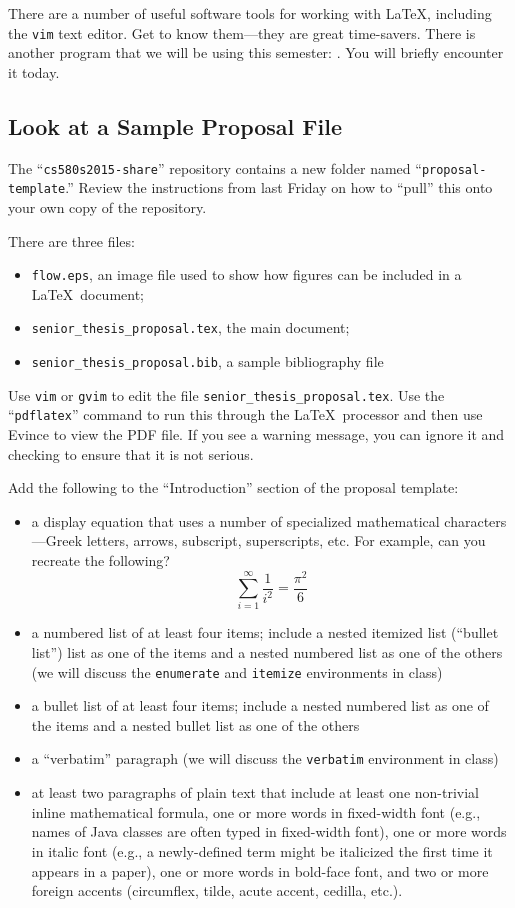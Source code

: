 There are a number of useful software tools for working with \LaTeX,
including the {\tt vim} text editor. Get to know them---they are great
time-savers.  There is another program that we will be using this
semester: \BibTeX. You will briefly encounter it today.

\subsection*{Look at a Sample Proposal File}
The ``{\tt cs580s2015-share}'' repository contains a new
folder named ``{\tt proposal-template}.'' Review the instructions from
last Friday on how to ``pull'' this onto your own copy of the repository.

There are three files: 
\begin{itemize}
    \itemsep0in
\item
{\tt flow.eps}, an image file used to show how
figures can be included in a \LaTeX\ document; 
\item
\verb$senior_thesis_proposal.tex$, the main document;
\item
\verb$senior_thesis_proposal.bib$, a sample bibliography file
\end{itemize}

Use {\tt vim} or {\tt gvim} to edit the file
\verb$senior_thesis_proposal.tex$.  Use the ``\verb$pdflatex$'' command
to run this through the \LaTeX\ processor and then use Evince to view
the PDF file. If you see a warning message, you can ignore it and
checking to ensure that it is not serious.

Add the following to the ``Introduction'' section of the proposal template:
\begin{itemize}
\item
a display equation that uses a number of specialized
mathematical characters---Greek letters, arrows, subscript, superscripts,
etc. For example, can you recreate the following?
\[\sum_{i=1}^{\infty}\frac{1}{i^2} = \frac{\pi^2}{6}\]
\item
a numbered list of at least four items; include a nested
itemized list (``bullet list'') list as one of the items  and
a nested numbered list as one of the others (we will discuss 
the {\tt enumerate} and {\tt itemize} environments in class)
\item
a bullet list of at least four items; include a nested numbered
list as one of the items and a nested bullet list as one of the others
\item
a ``verbatim'' paragraph (we will discuss the {\tt verbatim}
environment in class)
\item
at least two paragraphs of plain text that include at least one 
non-trivial inline
mathematical formula, one or more words in fixed-width font (e.g., names 
of Java classes are often typed in fixed-width font),
one or more words in italic font (e.g., a newly-defined term 
might be italicized the first
time it appears in a paper), one or more words in bold-face font, and
two or more foreign accents (circumflex, tilde, acute accent, cedilla, etc.).


\end{itemize}


